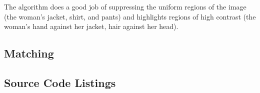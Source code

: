 \documentclass{article}
\begin{document}
\begin{center}
\end{center}
The algorithm does a good job of suppressing the uniform regions of the image (the woman's jacket, shirt, and pants) and highlights regions of high contrast (the woman's hand against her jacket, hair against her head).

\subsection{Matching}


\newpage
\begin{appendices}
\section{Source Code Listings}\label{source}
% 







\end{appendices}
\end{document}
